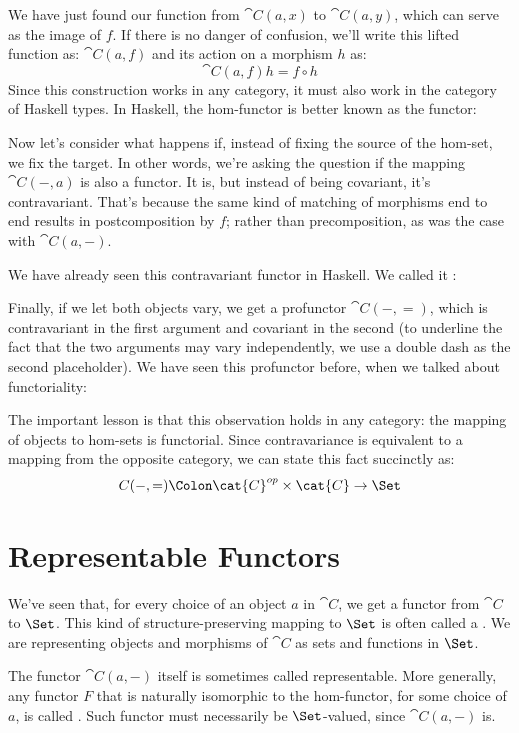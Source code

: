 \noindent
We have just found our function from $\cat{C}(a, x)$ to
$\cat{C}(a, y)$, which can serve as the image of $f$. If there
is no danger of confusion, we'll write this lifted function as: $\cat{C}(a, f)$
and its action on a morphism $h$ as:
\[\cat{C}(a, f) h = f \circ h\]
Since this construction works in any category, it must also work in the
category of Haskell types. In Haskell, the hom-functor is better known
as the  functor:


Now let's consider what happens if, instead of fixing the source of the
hom-set, we fix the target. In other words, we're asking the question if
the mapping $\cat{C}(-, a)$ is also a functor. It is, but instead of being covariant, it's
contravariant. That's because the same kind of matching of morphisms end
to end results in postcomposition by $f$; rather than
precomposition, as was the case with $\cat{C}(a, -)$.

We have already seen this contravariant functor in Haskell. We called it
:


Finally, if we let both objects vary, we get a profunctor
$\cat{C}(-, =)$, which is contravariant in the first argument and
covariant in the second (to underline the fact that the two arguments
may vary independently, we use a double dash as the second placeholder).
We have seen this profunctor before, when we talked about functoriality:

The important lesson is that this observation holds in any category: the
mapping of objects to hom-sets is functorial. Since contravariance is
equivalent to a mapping from the opposite category, we can state this
fact succinctly as:
\[C(-, =) \Colon \cat{C}^{op} \times \cat{C} \to \Set\]

\section{Representable Functors}

We've seen that, for every choice of an object $a$ in $\cat{C}$,
we get a functor from $\cat{C}$ to $\Set$. This kind of
structure-preserving mapping to $\Set$ is often called a
. We are representing objects and morphisms of
$\cat{C}$ as sets and functions in $\Set$.

The functor $\cat{C}(a, -)$ itself is sometimes called representable.
More generally, any functor $F$ that is naturally isomorphic to
the hom-functor, for some choice of $a$, is called
. Such functor must necessarily be
$\Set$-valued, since $\cat{C}(a, -)$ is.

